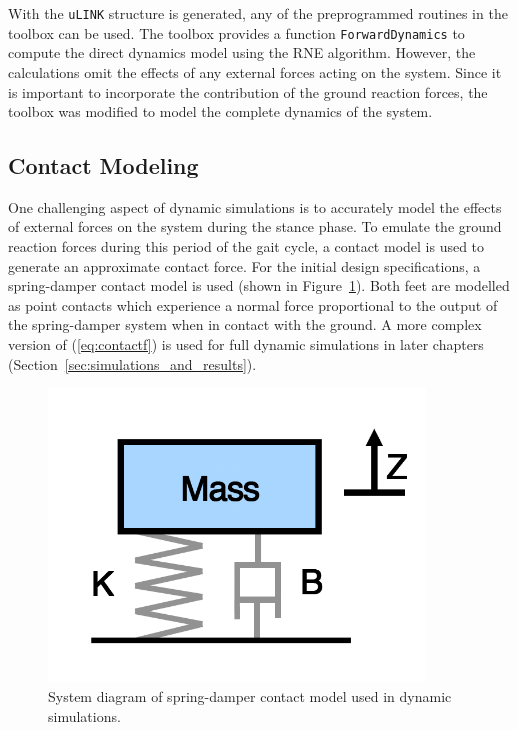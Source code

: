 With the \texttt{uLINK} structure is generated, any of the preprogrammed routines in the toolbox can be used. The toolbox provides a function \texttt{ForwardDynamics} to compute the direct dynamics model using the RNE algorithm. However, the calculations omit the effects of any external forces acting on the system. Since it is important to incorporate the contribution of the ground reaction forces, the toolbox was modified to model the complete dynamics of the system. 

\subsection{Contact Modeling} %
\label{sec:contact_modelling}

One challenging aspect of dynamic simulations is to accurately model the effects of external forces on the system during the stance phase. To emulate the ground reaction forces during this period of the gait cycle, a contact model is used to generate an approximate contact force. For the initial design specifications, a spring-damper contact model is used (shown in Figure~\ref{fig:springdamper}). Both feet are modelled as point contacts which experience a normal force proportional to the output of the spring-damper system when in contact with the ground. A more complex version of (\ref{eq:contactf}) is used for full dynamic simulations in later chapters (Section~\ref{sec:simulations_and_results}).

\begin{figure}[!h]
	\begin{center}
    \includegraphics[width=100mm]{fig/design/springdamper.png}
	\end{center}
  \caption{System diagram of spring-damper contact model used in dynamic simulations.}
  \label{fig:springdamper}
\end{figure}

